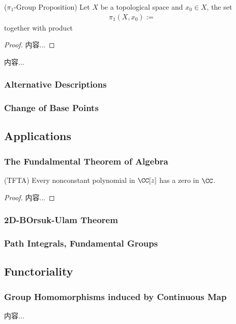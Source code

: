\documentclass[Total.tex]{subfiles}
\begin{document}
	\begin{proposition}
		($\pi_1$-Group Proposition) Let $X$ be a topological space and $x_0\in X$, the set
		\begin{gather*}
			\pi_1(X,x_0):=
		\end{gather*}
		together with product
	\end{proposition}
	\begin{proof}
		内容...
	\end{proof}
	
	\begin{Def}
		内容...
	\end{Def}
	\subsubsection{Alternative Descriptions}
	
	\subsubsection{Change of Base Points}
	\subsection{Applications}
	\subsubsection{The Fundalmental Theorem of Algebra}
	\begin{theorem}
		(TFTA) Every nonconstant polynomial in $\CC[z]$ has a zero in $\CC$.
	\end{theorem}
	\begin{proof}
		内容...
	\end{proof}
	\subsubsection{2D-BOrsuk-Ulam Theorem}
	\subsubsection{Path Integrals, Fundamental Groups}
	\subsection{Functoriality}
	\subsubsection{Group Homomorphisms induced by Continuous Map}
	\begin{Def}
		内容...
	\end{Def}
\end{document}
